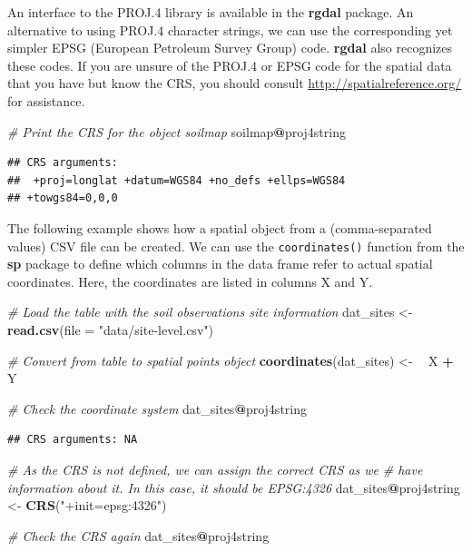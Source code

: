 \documentclass[10pt,b5paper,]{book}
\newenvironment{Shaded}{\begin{snugshade}}{\end{snugshade}}
\newcommand{\CommentTok}[1]{\textcolor[rgb]{0.56,0.35,0.01}{\textit{#1}}}
\newcommand{\DataTypeTok}[1]{\textcolor[rgb]{0.13,0.29,0.53}{#1}}
\newcommand{\ErrorTok}[1]{\textcolor[rgb]{0.64,0.00,0.00}{\textbf{#1}}}
\newcommand{\KeywordTok}[1]{\textcolor[rgb]{0.13,0.29,0.53}{\textbf{#1}}}
\newcommand{\NormalTok}[1]{#1}
\newcommand{\OperatorTok}[1]{\textcolor[rgb]{0.81,0.36,0.00}{\textbf{#1}}}
\newcommand{\StringTok}[1]{\textcolor[rgb]{0.31,0.60,0.02}{#1}}
\theoremstyle{definition}
\theoremstyle{definition}
\theoremstyle{definition}
\theoremstyle{remark}
\begin{document}
An interface to the PROJ.4 library is available in the \textbf{rgdal}
package. An alternative to using PROJ.4 character strings, we can use
the corresponding yet simpler EPSG (European Petroleum Survey Group)
code. \textbf{rgdal} also recognizes these codes. If you are unsure of
the PROJ.4 or EPSG code for the spatial data that you have but know the
CRS, you should consult \url{http://spatialreference.org/} for
assistance.

\begin{Shaded}
\begin{Highlighting}[]
\CommentTok{# Print the CRS for the object soilmap}
\NormalTok{soilmap}\OperatorTok{@}\NormalTok{proj4string}
\end{Highlighting}
\end{Shaded}

\begin{verbatim}
## CRS arguments:
##  +proj=longlat +datum=WGS84 +no_defs +ellps=WGS84
## +towgs84=0,0,0
\end{verbatim}

The following example shows how a spatial object from a (comma-separated
values) CSV file can be created. We can use the \texttt{coordinates()}
function from the \textbf{sp} package to define which columns in the
data frame refer to actual spatial coordinates. Here, the coordinates
are listed in columns X and Y.

\begin{Shaded}
\begin{Highlighting}[]
\CommentTok{# Load the table with the soil observations site information}
\NormalTok{dat_sites <-}\StringTok{ }\KeywordTok{read.csv}\NormalTok{(}\DataTypeTok{file =} \StringTok{"data/site-level.csv"}\NormalTok{)}

\CommentTok{# Convert from table to spatial points object}
\KeywordTok{coordinates}\NormalTok{(dat_sites) <-}\StringTok{ }\ErrorTok{~}\StringTok{ }\NormalTok{X }\OperatorTok{+}\StringTok{ }\NormalTok{Y}

\CommentTok{# Check the coordinate system}
\NormalTok{dat_sites}\OperatorTok{@}\NormalTok{proj4string}
\end{Highlighting}
\end{Shaded}

\begin{verbatim}
## CRS arguments: NA
\end{verbatim}

\begin{Shaded}
\begin{Highlighting}[]
\CommentTok{# As the CRS is not defined, we can assign the correct CRS as we}
\CommentTok{# have information about it. In this case, it should be EPSG:4326}
\NormalTok{dat_sites}\OperatorTok{@}\NormalTok{proj4string <-}\StringTok{ }\KeywordTok{CRS}\NormalTok{(}\StringTok{"+init=epsg:4326"}\NormalTok{)}

\CommentTok{# Check the CRS again}
\NormalTok{dat_sites}\OperatorTok{@}\NormalTok{proj4string}
\end{Highlighting}
\end{Shaded}
\end{document}
